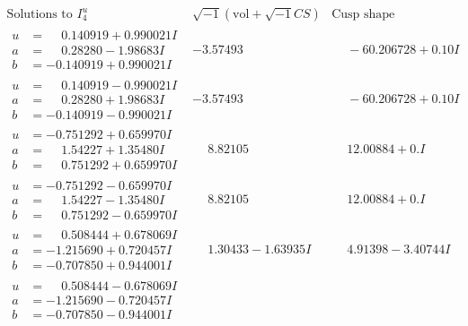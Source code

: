\documentclass[1p]{elsarticle_modified}
\theoremstyle{definition}
\newcommand{\I}{\sqrt{-1}}
\begin{document}
$$\begin{array}{c|c|c}  
\text{Solutions to }I^u_{4}& \I (\text{vol} + \sqrt{-1}CS) & \text{Cusp shape}\\
 \hline 
\begin{aligned}
u &= \phantom{-}0.140919 + 0.990021 I \\
a &= \phantom{-}0.28280 - 1.98683 I \\
b &= -0.140919 + 0.990021 I\end{aligned}
 & -3.57493\phantom{ +0.000000I} & \phantom{-}                -6
0.206728 + 0. 10   I\phantom{ +0.000000I} \\ \hline\begin{aligned}
u &= \phantom{-}0.140919 - 0.990021 I \\
a &= \phantom{-}0.28280 + 1.98683 I \\
b &= -0.140919 - 0.990021 I\end{aligned}
 & -3.57493\phantom{ +0.000000I} & \phantom{-}                -6
0.206728 + 0. 10   I\phantom{ +0.000000I} \\ \hline\begin{aligned}
u &= -0.751292 + 0.659970 I \\
a &= \phantom{-}1.54227 + 1.35480 I \\
b &= \phantom{-}0.751292 + 0.659970 I\end{aligned}
 & \phantom{-}8.82105\phantom{ +0.000000I} & \phantom{-}12.00884 + 0. I\phantom{ +0.000000I} \\ \hline\begin{aligned}
u &= -0.751292 - 0.659970 I \\
a &= \phantom{-}1.54227 - 1.35480 I \\
b &= \phantom{-}0.751292 - 0.659970 I\end{aligned}
 & \phantom{-}8.82105\phantom{ +0.000000I} & \phantom{-}12.00884 + 0. I\phantom{ +0.000000I} \\ \hline\begin{aligned}
u &= \phantom{-}0.508444 + 0.678069 I \\
a &= -1.215690 + 0.720457 I \\
b &= -0.707850 + 0.944001 I\end{aligned}
 & \phantom{-}1.30433 - 1.63935 I & \phantom{-}4.91398 - 3.40744 I \\ \hline\begin{aligned}
u &= \phantom{-}0.508444 - 0.678069 I \\
a &= -1.215690 - 0.720457 I \\
b &= -0.707850 - 0.944001 I\end{aligned}

\end{array}$$
\end{document}
